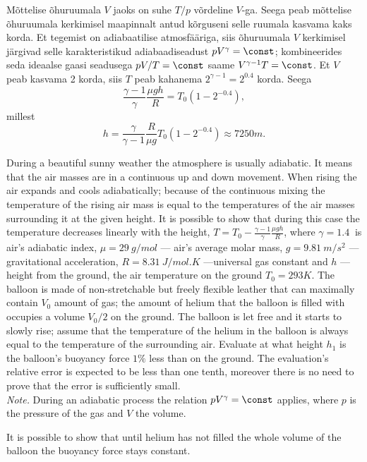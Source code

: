 {Mõttelise õhuruumala $V$ jaoks on suhe $T/p$ võrdeline $V$-ga. Seega peab mõttelise õhuruumala kerkimisel maapinnalt antud kõrguseni selle ruumala kasvama kaks korda. Et tegemist on adiabaatilise atmosfääriga, siis õhuruumala $V$ kerkimisel järgivad selle karakteristikud adiabaadiseadust $pV^\gamma=\const$; kombineerides seda ideaalse gaasi seadusega $pV/T=\const$ saame $V^{\gamma-1}T=\const$. Et $V$ peab kasvama 2 korda, siis $T$ peab kahanema $2^{\gamma-1}=2^{0.4}$ korda. Seega
\[
\frac{\gamma-1}\gamma\frac{\mu g h}R =T_0(1-2^{-0.4}),
\]
millest
\[
h=\frac\gamma{\gamma-1}\frac R{\mu g}T_0(1-2^{-0.4})\approx\SI{7250}m.
\]
\fi


\ifEngStatement
During a beautiful sunny weather the atmosphere is usually adiabatic. It means that the air masses are in a continuous up and down movement. When rising the air expands and cools adiabatically; because of the continuous mixing the temperature of the rising air mass is equal to the temperatures of the air masses surrounding it at the given height. It is possible to show that during this case the temperature decreases linearly with the height, $T=T_0-\frac{\gamma-1}\gamma\frac{\mu g h}R$, where $\gamma=\SI{1.4}{	}$ is air's adiabatic index, $\mu=\SI{29}{g/mol}$ — air's average molar mass, $g=\SI{9.81}{m/s^2}$ — gravitational acceleration, $R=\SI{8.31}{J/mol.K}$ —universal gas constant and $h$ — height from the ground, the air temperature on the ground $T_0=\SI{293}K$. The balloon is made of non-stretchable but freely flexible leather that can maximally contain $V_0$ amount of gas; the amount of helium that the balloon is filled with occupies a volume $V_0/2$ on the ground. The balloon is let free and it starts to slowly rise; assume that the temperature of the helium in the balloon is always equal to the temperature of the surrounding air. Evaluate at what height $h_1$ is the balloon's buoyancy force $1\%$ less than on the ground. The evaluation's relative error is expected to be less than one tenth, moreover there is no need to prove that the error is sufficiently small.\\
\emph{Note.}  During an adiabatic process the relation $pV^\gamma = \const$ applies, where $p$ is the pressure of the gas and $V$ the volume.
\fi


\ifEngHint
It is possible to show that until helium has not filled the whole volume of the balloon the buoyancy force stays constant.
\fi


}
